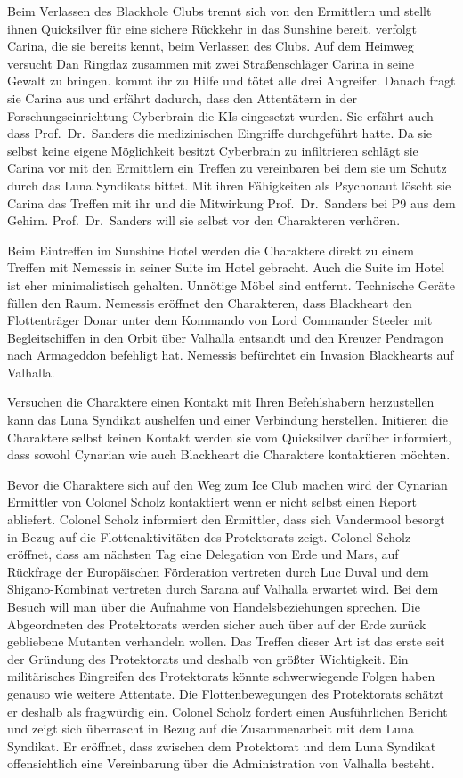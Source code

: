 
Beim Verlassen des Blackhole Clubs trennt sich \xl{} von den Ermittlern und stellt ihnen Quicksilver für eine sichere Rückkehr in das Sunshine bereit. \xl{} verfolgt Carina, die sie bereits kennt, beim Verlassen des Clubs. Auf dem Heimweg versucht Dan Ringdaz zusammen mit zwei Straßenschläger Carina in seine Gewalt zu bringen. \xl{} kommt ihr zu Hilfe und tötet alle drei Angreifer. Danach fragt sie Carina aus und erfährt dadurch, dass den Attentätern in der Forschungseinrichtung Cyberbrain die KIs eingesetzt wurden. Sie erfährt auch dass Prof.~Dr.~Sanders die medizinischen Eingriffe durchgeführt hatte. Da sie selbst keine eigene Möglichkeit besitzt Cyberbrain zu infiltrieren schlägt sie Carina vor mit den Ermittlern ein Treffen zu vereinbaren bei dem sie um Schutz durch das Luna Syndikats bittet. Mit ihren Fähigkeiten als Psychonaut löscht sie Carina das Treffen mit ihr und die Mitwirkung Prof.~Dr.~Sanders bei P9 aus dem Gehirn. Prof.~Dr.~Sanders will sie selbst vor den Charakteren verhören.

Beim Eintreffen im Sunshine Hotel werden die Charaktere direkt zu einem Treffen mit Nemessis in seiner Suite im Hotel gebracht. Auch die Suite im Hotel ist eher minimalistisch gehalten. Unnötige Möbel sind entfernt. Technische Geräte füllen den Raum. Nemessis eröffnet den Charakteren, dass Blackheart den Flottenträger Donar unter dem Kommando von Lord Commander Steeler mit Begleitschiffen in den Orbit über Valhalla entsandt und den Kreuzer Pendragon nach Armageddon befehligt hat. Nemessis befürchtet ein Invasion Blackhearts auf Valhalla.

Versuchen die Charaktere einen Kontakt mit Ihren Befehlshabern herzustellen kann das Luna Syndikat aushelfen und einer Verbindung herstellen. Initieren die Charaktere selbst keinen Kontakt werden sie vom Quicksilver darüber informiert, dass sowohl Cynarian wie auch Blackheart die Charaktere kontaktieren möchten.

Bevor die Charaktere sich auf den Weg zum Ice Club machen wird der Cynarian Ermittler von Colonel Scholz kontaktiert wenn er nicht selbst einen Report abliefert. Colonel Scholz informiert den Ermittler, dass sich Vandermool besorgt in Bezug auf die Flottenaktivitäten des Protektorats zeigt. Colonel Scholz eröffnet, dass am nächsten Tag eine Delegation von Erde und Mars, auf Rückfrage der Europäischen Förderation vertreten durch Luc Duval und dem Shigano-Kombinat vertreten durch Sarana auf Valhalla erwartet wird. Bei dem Besuch will man über die Aufnahme von Handelsbeziehungen sprechen. Die Abgeordneten des Protektorats werden sicher auch über auf der Erde zurück gebliebene Mutanten verhandeln wollen. Das Treffen dieser Art ist das erste seit der Gründung des Protektorats und deshalb von größter Wichtigkeit. Ein militärisches Eingreifen des Protektorats könnte schwerwiegende Folgen haben genauso wie weitere Attentate. Die Flottenbewegungen des Protektorats schätzt er deshalb als fragwürdig ein. Colonel Scholz fordert einen Ausführlichen Bericht und zeigt sich überrascht in Bezug auf die Zusammenarbeit mit dem Luna Syndikat. Er eröffnet, dass zwischen dem Protektorat und dem Luna Syndikat offensichtlich eine Vereinbarung über die Administration von Valhalla besteht.

